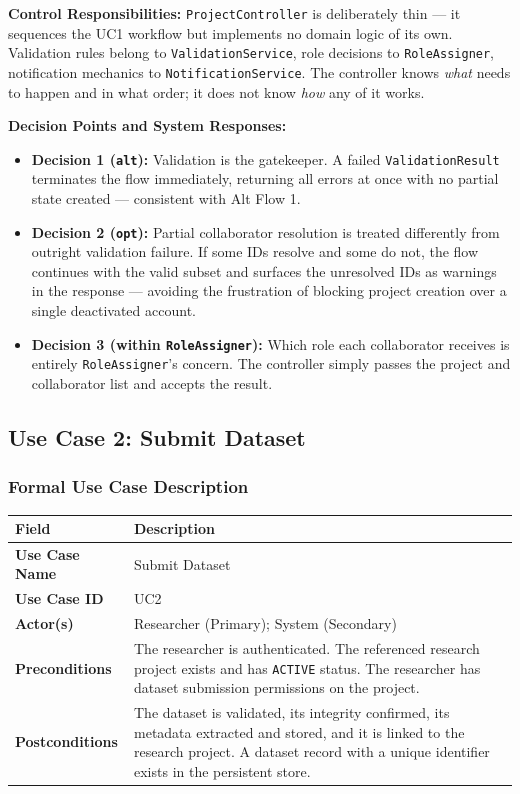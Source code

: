 \documentclass[12pt,a4paper]{article}
\newcommand{\code}[1]{\texttt{\small #1}}
\begin{document}
\noindent\textbf{Control Responsibilities:} \code{ProjectController} is deliberately thin --- it sequences the UC1 workflow but implements no domain logic of its own. Validation rules belong to \code{ValidationService}, role decisions to \code{RoleAssigner}, notification mechanics to \code{NotificationService}. The controller knows \textit{what} needs to happen and in what order; it does not know \textit{how} any of it works.

\noindent\textbf{Decision Points and System Responses:}
\begin{itemize}
  \item \textbf{Decision 1 (\code{alt}):} Validation is the gatekeeper. A failed \code{ValidationResult} terminates the flow immediately, returning all errors at once with no partial state created --- consistent with Alt Flow 1.
  \item \textbf{Decision 2 (\code{opt}):} Partial collaborator resolution is treated differently from outright validation failure. If some IDs resolve and some do not, the flow continues with the valid subset and surfaces the unresolved IDs as warnings in the response --- avoiding the frustration of blocking project creation over a single deactivated account.
  \item \textbf{Decision 3 (within \code{RoleAssigner}):} Which role each collaborator receives is entirely \code{RoleAssigner}'s concern. The controller simply passes the project and collaborator list and accepts the result.
\end{itemize}

\subsection{Use Case 2: Submit Dataset}

\subsubsection{Formal Use Case Description}

\begin{center}
\begin{tabularx}{\textwidth}{@{}lL@{}}
  \toprule
  \textbf{Field} & \textbf{Description} \\
  \midrule
  \textbf{Use Case Name}  & Submit Dataset \\
  \textbf{Use Case ID}    & UC2 \\
  \textbf{Actor(s)}       & Researcher (Primary); System (Secondary) \\
  \textbf{Preconditions}  & The researcher is authenticated. The referenced research project exists and has \code{ACTIVE} status. The researcher has dataset submission permissions on the project. \\
  \textbf{Postconditions} & The dataset is validated, its integrity confirmed, its metadata extracted and stored, and it is linked to the research project. A dataset record with a unique identifier exists in the persistent store. \\
  \bottomrule
\end{tabularx}
\end{center}
\end{document}
